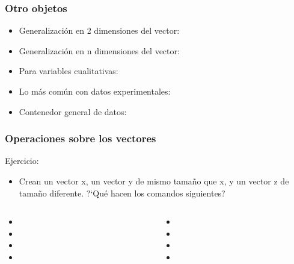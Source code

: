 \documentclass[mathserif]{beamer}
\begin{document}
\begin{frame}[plain,label=d14]%
   \frametitle{Otro objetos}
   \begin{itemize}
      \item Generalizaci\'on en 2 dimensiones del vector: 
      \item Generalizaci\'on en n dimensiones del vector: 
      \item Para variables cualitativas: 
      \item Lo m\'as com\'un con datos experimentales: 
      \item Contenedor general de datos: 
   \end{itemize}
\end{frame}%

\begin{frame}[plain,label=d15]%
\frametitle{Operaciones sobre los vectores }
\begin{exampleblock}{Ejercicio:}
\begin{itemize}
   \item Crean un vector x, un vector y de mismo tama\~no que x, y un vector z de tama\~no diferente. ?`Qu\'e hacen los comandos siguientes?
\end{itemize}
   \begin{columns}[c, totalwidth=10cm]
      \begin{column}[]{4cm}
         \begin{itemize}
            \item {}
            \item {}
            \item {}
            \item {}
         \end{itemize}
      \end{column}
      \begin{column}[]{4cm}
         \begin{itemize}
            \item {}
            \item {}
            \item {}
            \item {}
         \end{itemize}
      \end{column}
   \end{columns}
\end{exampleblock}
\end{frame}%
\end{document}
